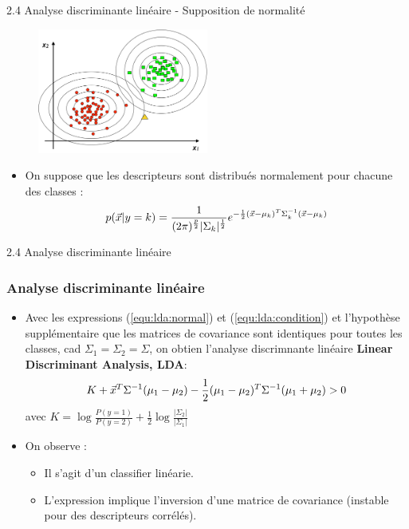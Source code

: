 \begin{frame}{2.4 Analyse discriminante linéaire - Supposition de normalité}
\begin{figure}[htb]
\includegraphics[width=0.5\textwidth]{figures/LDA.pdf}
\end{figure}
\begin{itemize}
\item On suppose que les descripteurs sont distribués normalement pour chacune des classes : 
\begin{equation}\label{equ:lda:normal}
p(\vec{x}|y=k)=\frac{1}{(2\pi)^{\frac{p}{2}}|\Sigma_k|^{\frac{1}{2}}}e^{-\frac{1}{2}(\vec{x}-\mu_k)^T\Sigma_k^{-1}(\vec{x}-\mu_k)}
\end{equation}
\end{itemize}
\end{frame}

\begin{frame}{2.4 Analyse discriminante linéaire}
\frametitle{Analyse discriminante linéaire}
\begin{itemize}
\item Avec les expressions (\ref{equ:lda:normal}) et (\ref{equ:lda:condition}) et l'hypothèse supplémentaire que les matrices de covariance sont identiques pour toutes les classes, cad
$\Sigma_1 = \Sigma_2 = \Sigma$, on obtien l'analyse discrimnante linéaire {\bf Linear Discriminant Analysis, LDA}:
\begin{equation*}
K + \vec{x}^T\Sigma^{-1}(\mu_1-\mu_2) - \frac{1}{2}(\mu_1-\mu_2)^T\Sigma^{-1}(\mu_1+\mu_2) > 0
\end{equation*}
avec $K=\log{\frac{P(y=1)}{P(y=2)}} + \frac{1}{2}\log{\frac{|\Sigma_2|}{|\Sigma_1|}}$
\item On observe : 
\begin{itemize}
  \item Il s'agit d'un classifier linéarie. 
  \item L'expression implique l'inversion d'une matrice de covariance (instable pour des descripteurs corrélés). 
\end{itemize} 
\end{itemize} 
\end{frame}





